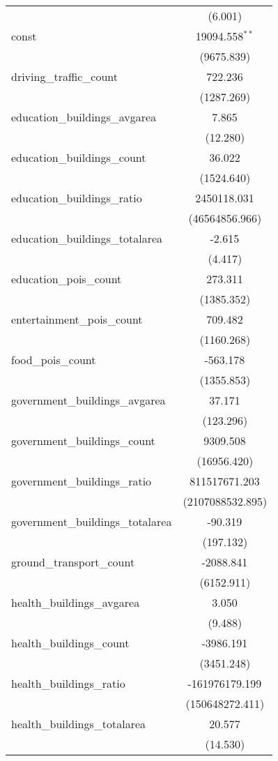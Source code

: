 \begin{table}[!htbp]
\begin{tabular}{@{\extracolsep{5pt}}lc}
  & (6.001) \\
 const & 19094.558$^{**}$ \\
  & (9675.839) \\
 driving_traffic_count & 722.236$^{}$ \\
  & (1287.269) \\
 education_buildings_avgarea & 7.865$^{}$ \\
  & (12.280) \\
 education_buildings_count & 36.022$^{}$ \\
  & (1524.640) \\
 education_buildings_ratio & 2450118.031$^{}$ \\
  & (46564856.966) \\
 education_buildings_totalarea & -2.615$^{}$ \\
  & (4.417) \\
 education_pois_count & 273.311$^{}$ \\
  & (1385.352) \\
 entertainment_pois_count & 709.482$^{}$ \\
  & (1160.268) \\
 food_pois_count & -563.178$^{}$ \\
  & (1355.853) \\
 government_buildings_avgarea & 37.171$^{}$ \\
  & (123.296) \\
 government_buildings_count & 9309.508$^{}$ \\
  & (16956.420) \\
 government_buildings_ratio & 811517671.203$^{}$ \\
  & (2107088532.895) \\
 government_buildings_totalarea & -90.319$^{}$ \\
  & (197.132) \\
 ground_transport_count & -2088.841$^{}$ \\
  & (6152.911) \\
 health_buildings_avgarea & 3.050$^{}$ \\
  & (9.488) \\
 health_buildings_count & -3986.191$^{}$ \\
  & (3451.248) \\
 health_buildings_ratio & -161976179.199$^{}$ \\
  & (150648272.411) \\
 health_buildings_totalarea & 20.577$^{}$ \\
  & (14.530) \\

\end{tabular}
\end{table}

